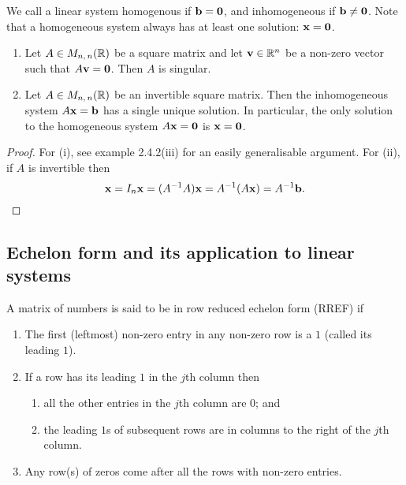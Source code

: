 \documentclass[10pt, a4paper]{article}
\begin{document}
We call a linear system homogenous if $\mathbf{b} = \mathbf{0}$,
and inhomogeneous if $\mathbf{b} \neq \mathbf{0}$.
Note that a homogeneous system always has at least one solution: $\mathbf{x} =\mathbf{0}$.

\begin{lemma}\label{linalg:lem:invprop}\phantom{}
    \begin{enumerate}[label = (\roman*)]
        \item Let $A \in M_{n,\,n}(\mathbb{R})$ be a square matrix and let $\mathbf{v} \in \mathbb{R} ^ n$ be a non-zero vector such that $A\mathbf{v} = \mathbf{0}$. Then $A$ is singular.
        \item Let $A \in M_{n,\,n}(\mathbb{R})$ be an invertible square matrix. Then the inhomogeneous system $A\mathbf{x} = \mathbf{b}$ has a single unique solution. In particular, the only solution to the homogeneous system $A\mathbf{x} = \mathbf{0}$ is $\mathbf{x} = \mathbf{0}$.
    \end{enumerate}
    \begin{proof}
        For (i), see example 2.4.2(iii) for an easily generalisable argument. For (ii), if $A$ is invertible then
        \[
        \mathbf{x} = I_n\mathbf{x} = (A ^ {-1} A)\mathbf{x} = A ^ {-1}(A\mathbf{x}) = A ^ {-1}\mathbf{b}.
        \]
    \end{proof}
\end{lemma}

\subsection{Echelon form and its application to linear systems}

\begin{definition}
    A matrix of numbers is said to be in row reduced echelon form (RREF) if
    \begin{enumerate}[label = (\roman*)]
        \item The first (leftmost) non-zero entry in any non-zero row is a $1$ (called its leading $1$).
        \item If a row has its leading $1$ in the $j$th column then
        \begin{enumerate}[label = (\alph*)]
            \item all the other entries in the $j$th column are $0$; and
            \item the leading $1$s of subsequent rows are in columns to the right of the $j$th column.
        \end{enumerate}
    \item Any row(s) of zeros come after all the rows with non-zero entries.
    \end{enumerate}
\end{definition}
\end{document}
